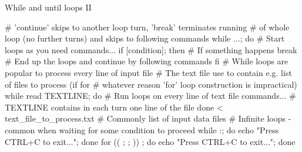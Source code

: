 \documentclass[compress, xelatex, 11pt, xcolor=svgnames, aspectratio=169,
	hyperref={
		bookmarks=true,
		unicode=true,
		colorlinks=true,
		pdftitle={Linux, command line and MetaCentrum},
		plainpages=false,
		pdfauthor={Vojtech Zeisek},
		pdfsubject={Course about use of Linux command line, writing shell scripts and using MetaCentrum of CESNET},
		pdfcreator={XeLaTeX},
		pdfkeywords={Linux, GNU, BASH, shell, command line, MetaCentrum},
		linkcolor=DarkRed, %
		anchorcolor=DarkBlue, %
		citecolor=Indigo, %
		filecolor=NavyBlue, %
		menucolor=DarkMagenta, %
		urlcolor=DarkBlue, %
		},
	url={hyphens, lowtilde} %
	]{beamer}
\begin{document}
\begin{frame}[fragile]{While and until loops II}
	\begin{bashcode}
    # 'continue' skips to another loop turn, 'break' terminates running
    # of whole loop (no further turns) and skips to following commands
    while ...; do # Start loops as you need
      commands...
      if [condition]; then # If something happens
        break # End up the loops and continue by following commands
        fi
    # While loops are popular to process every line of input file
    # The text file use to contain e.g. list of files to process (if for
    # whatever reason 'for' loop construction is impractical)
    while read TEXTLINE; do # Run loops on every line of text file
      commands... # TEXTLINE contains in each turn one line of the file
      done < text_file_to_process.txt # Commonly list of input data files
    # Infinite loops - common when waiting for some condition to proceed
    while :; do echo "Press CTRL+C to exit..."; done
    for (( ; ; )) ; do echo "Press CTRL+C to exit..."; done
	\end{bashcode}
\end{frame}

\subsection{}
\end{document}
